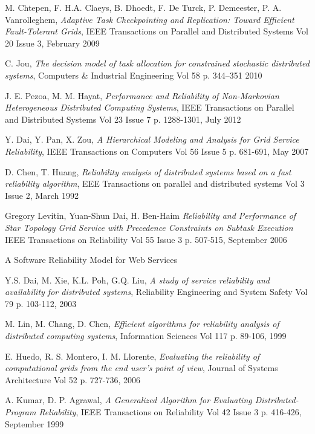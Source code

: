 \documentclass{cslthse-msc}
\begin{document}
\begin{thebibliography}{50}
	M. Chtepen, F. H.A. Claeys, B. Dhoedt, F. De Turck, P. Demeester, P. A. Vanrolleghem,
	\emph{Adaptive Task Checkpointing and Replication: Toward Efficient Fault-Tolerant Grids},
	IEEE Transactions on Parallel and Distributed Systems Vol 20 Issue 3,
	February 2009

	C. Jou,
	\emph{The decision model of task allocation for constrained stochastic distributed systems},
	Computers \& Industrial Engineering Vol 58 p. 344–351
	2010

	J. E. Pezoa, M. M. Hayat,
	\emph{Performance and Reliability of Non-Markovian Heterogeneous Distributed Computing Systems},
	IEEE Transactions on Parallel and Distributed Systems Vol 23 Issue 7 p. 1288-1301,
	July 2012

	Y. Dai, Y. Pan, X. Zou,
	\emph{A Hierarchical Modeling and Analysis for Grid Service Reliability},
	IEEE Transactions on Computers Vol 56 Issue 5 p. 681-691,
	May 2007

	D. Chen, T. Huang,
	\emph{Reliability analysis of distributed systems based on a fast reliability algorithm},
	EEE Transactions on parallel and distributed systems Vol 3 Issue 2,
	March 1992

	Gregory Levitin, Yuan-Shun Dai, H. Ben-Haim
	\emph{Reliability and Performance of Star Topology Grid Service with Precedence Constraints on Subtask Execution}
	IEEE Transactions on Reliability Vol 55 Issue 3 p. 507-515,
	September 2006

A Software Reliability Model for Web Services

	Y.S. Dai, M. Xie, K.L. Poh, G.Q. Liu,
	\emph{A study of service reliability and availability for distributed systems},
	Reliability Engineering and System Safety Vol 79 p. 103-112,
	2003

	M. Lin, M. Chang, D. Chen,
	\emph{Efficient algorithms for reliability analysis of distributed computing systems},
	Information Sciences Vol 117 p. 89-106,
	1999

	E. Huedo, R. S. Montero, I. M. Llorente,
	\emph{Evaluating the reliability of computational grids from the end user’s point of view},
	Journal of Systems Architecture Vol 52 p. 727-736,
	2006

	A. Kumar, D. P. Agrawal,
	\emph{A Generalized Algorithm for Evaluating Distributed-Program Reliability},
	IEEE Transactions on Reliability Vol 42 Issue 3 p. 416-426,
	September 1999


\end{thebibliography}
\end{document}
